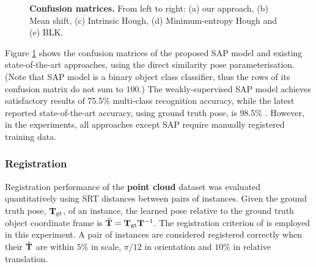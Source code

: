 \begin{figure}[ht]
\begin{subfigure}[t]{0.32\linewidth}
	\end{subfigure}
	\caption{\textbf{Confusion matrices.} From left to right: (a) our approach, (b) Mean shift, (c) Intrinsic Hough, (d) Minimum-entropy Hough and (e) BLK.}
	\label{fig/reg/recresult3d}
\end{figure}




Figure \ref{fig/reg/recresult3d} shows the confusion matrices of the proposed SAP model and existing state-of-the-art approaches, using the direct similarity pose parameterisation. (Note that SAP model is a binary object class classifier, thus the rows of its confusion matrix do not sum to $100$.)
The weakly-supervised SAP model achieves satisfactory results of 75.5\% multi-class recognition accuracy, while the latest reported state-of-the-art accuracy, using ground truth pose, is 98.5\% \cite{Woodford2013}. However, in the experiments, all approaches except SAP require manually registered training data.    

\subsubsection{Registration} 
\label{sec/reg/reg}
Registration performance of the \textbf{point cloud} dataset was evaluated quantitatively using SRT distances \cite{Pham2011} between pairs of instances. Given the ground truth pose, $\mathbf{T}_\mathrm{gt}$, of an instance, the learned pose relative to the ground truth object coordinate frame is $\tilde{\mathbf{T}} = \mathbf{T}_\mathrm{gt}\mathbf{T}^{-1}$.  
The registration criterion of \cite{Pham2011} is employed in this experiment. A pair of instances are considered registered correctly when their $\tilde{\mathbf{T}}$ are within $5\%$ in scale, $\pi/12$ in orientation and $10\%$ in relative translation.

